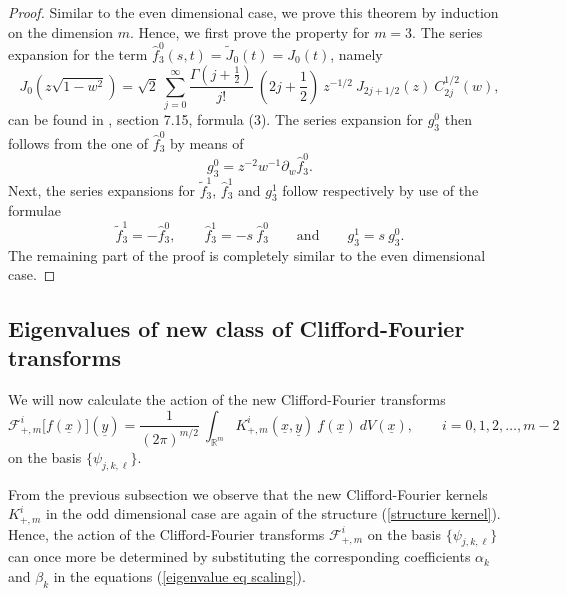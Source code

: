 \documentclass{amsart}
\theoremstyle{remark}
\begin{document}
\begin{proof}
Similar to the even dimensional case, we prove this theorem by induction on the dimension $m$. Hence, we first prove the property for $m=3$. The series expansion for the term $\hat{f}^0_3(s,t) = \widetilde{J}_0(t) = J_0(t)$, namely
\begin{displaymath}
J_0(z \sqrt{1-w^2}) = \sqrt{2} \ \sum_{j=0}^{\infty} \frac{\Gamma \left( j+ \frac{1}{2} \right)}{j!} \ \left( 2j+\frac{1}{2} \right) \ z^{-1/2} \ J_{2j+1/2}(z) \ C_{2j}^{1/2}(w),
\end{displaymath}
can be found in \cite{Erde}, section 7.15, formula (3). The series expansion for $g_3^0$ then follows from the one of $\hat{f}_3^0$ by means of
\begin{displaymath}
g_3^0 = z^{-2}  w^{-1}  \partial_w \hat{f}_3^0 .
\end{displaymath}
Next, the series expansions for $\tilde{f}_3^1$, $\hat{f}_3^1$ and $g_3^1$ follow respectively by use of the formulae
\begin{displaymath}
\tilde{f}_3^1 = - \hat{f}_3^0 , \qquad \hat{f}_3^1 = -s \ \hat{f}_3^0 \qquad \mathrm{and} \qquad g_3^1 = s \ g_3^0  .
\end{displaymath}
The remaining part of the proof is completely similar to the even dimensional case.
\end{proof}
\subsection{Eigenvalues of new class of Clifford-Fourier transforms}
\label{eigvalsodd}

We will now calculate the action of the new Clifford-Fourier transforms
\begin{displaymath}
\mathcal{F}^{i}_{+,m} \lbrack f({\underline{x}}) \rbrack ({\underline{y}}) = \frac{1}{(2 \pi)^{m/2}} \ \int_{\mathbb{R}^m} K^{i}_{+,m}({\underline{x}},{\underline{y}}) \ f({\underline{x}}) \ dV({\underline{x}}), \qquad i=0,1,2,\ldots,m-2
\end{displaymath}
on the basis $\lbrace \psi_{j,k,\ell} \rbrace$. 

From the previous subsection we observe that the new Clifford-Fourier kernels $K_{+,m}^{i}$ in the odd dimensional case are again of the structure (\ref{structure kernel}). Hence, the action of the Clifford-Fourier transforms $\mathcal{F}^{i}_{+,m}$ on the basis $\lbrace \psi_{j,k,\ell} \rbrace$ can once more be determined by substituting the corresponding coefficients $\alpha_k$ and $\beta_k$ in the equations (\ref{eigenvalue eq scaling}). 
\end{document}
